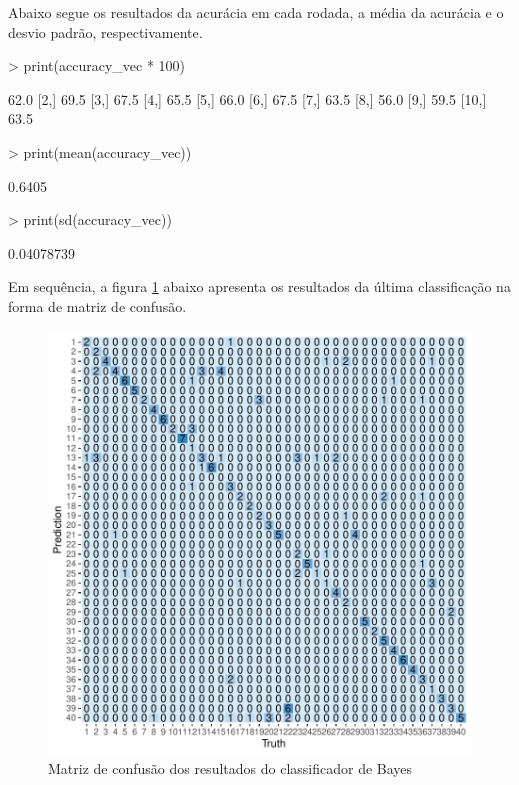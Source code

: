 \documentclass[12pt]{article}
\begin{document}
  \par Abaixo segue os resultados da acurácia em cada rodada, a média da acurácia e o desvio padrão, respectivamente.
  
\begin{Schunk}
\begin{Sinput}
> print(accuracy_vec * 100)
\end{Sinput}
\begin{Soutput}
      [,1]
 [1,] 62.0
 [2,] 69.5
 [3,] 67.5
 [4,] 65.5
 [5,] 66.0
 [6,] 67.5
 [7,] 63.5
 [8,] 56.0
 [9,] 59.5
[10,] 63.5
\end{Soutput}
\end{Schunk}

\begin{Schunk}
\begin{Sinput}
> print(mean(accuracy_vec))
\end{Sinput}
\begin{Soutput}
[1] 0.6405
\end{Soutput}
\begin{Sinput}
> print(sd(accuracy_vec))
\end{Sinput}
\begin{Soutput}
[1] 0.04078739
\end{Soutput}
\end{Schunk}

\par Em sequência, a figura \ref{1} abaixo apresenta os resultados da última classificação na forma de matriz de confusão.

\begin{figure}[ht]
\centering
\includegraphics{PCA-008}
\caption{Matriz de confusão dos resultados do classificador de Bayes}
\label{1}
\end{figure}
\end{document}
